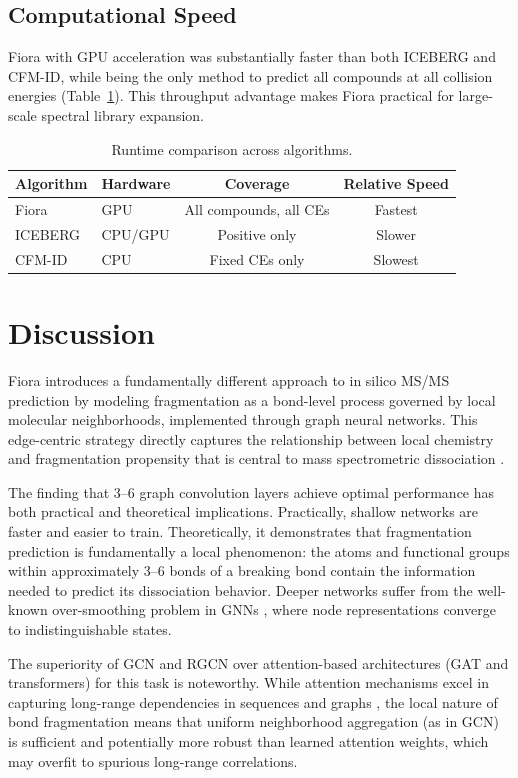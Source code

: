 \documentclass[11pt]{article}
\begin{document}
\subsection{Computational Speed}

Fiora with GPU acceleration was substantially faster than both ICEBERG and CFM-ID, while being the only method to predict all compounds at all collision energies (Table~\ref{tab:speed}). This throughput advantage makes Fiora practical for large-scale spectral library expansion.

\begin{table}[H]
\centering
\caption{Runtime comparison across algorithms.}
\label{tab:speed}
\begin{tabular}{llcc}
\toprule
Algorithm & Hardware & Coverage & Relative Speed \\
\midrule
Fiora & GPU & All compounds, all CEs & Fastest \\
ICEBERG & CPU/GPU & Positive only & Slower \\
CFM-ID & CPU & Fixed CEs only & Slowest \\
\bottomrule
\end{tabular}
\end{table}

\section{Discussion}

Fiora introduces a fundamentally different approach to in silico MS/MS prediction by modeling fragmentation as a bond-level process governed by local molecular neighborhoods, implemented through graph neural networks. This edge-centric strategy directly captures the relationship between local chemistry and fragmentation propensity that is central to mass spectrometric dissociation \citep{Allen2015,Duhrkop2015}.

The finding that 3--6 graph convolution layers achieve optimal performance has both practical and theoretical implications. Practically, shallow networks are faster and easier to train. Theoretically, it demonstrates that fragmentation prediction is fundamentally a local phenomenon: the atoms and functional groups within approximately 3--6 bonds of a breaking bond contain the information needed to predict its dissociation behavior. Deeper networks suffer from the well-known over-smoothing problem in GNNs \citep{Li2018,Kipf2017}, where node representations converge to indistinguishable states.

The superiority of GCN and RGCN over attention-based architectures (GAT and transformers) for this task is noteworthy. While attention mechanisms excel in capturing long-range dependencies in sequences and graphs \citep{Vaswani2017,Velickovic2018}, the local nature of bond fragmentation means that uniform neighborhood aggregation (as in GCN) is sufficient and potentially more robust than learned attention weights, which may overfit to spurious long-range correlations.
\end{document}
